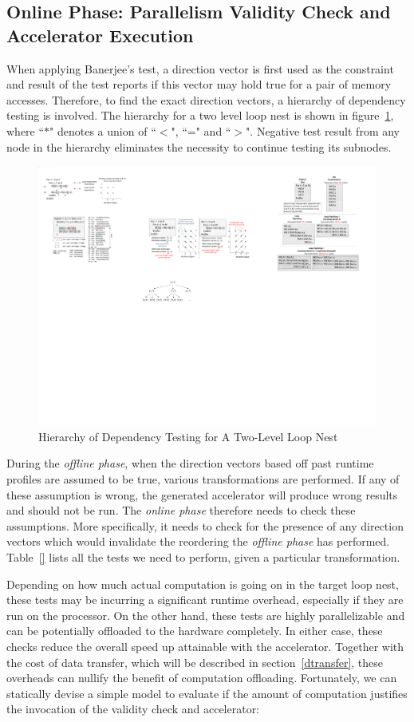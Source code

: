 \subsection{Online Phase: Parallelism Validity Check and Accelerator Execution}
\label{onlinephase}
When applying Banerjee's test, a direction vector is first used as the constraint and result of the test reports if this vector may hold true for a pair of memory accesses. Therefore, to find the exact direction vectors, a hierarchy
of dependency testing is involved. The hierarchy for a two level loop nest is shown in figure~\ref{fig:testingHier}, where ``$\ast$" denotes a union of ``$<$", ``=" and ``$>$". Negative test result from any node in the hierarchy eliminates the necessity to continue testing its subnodes.  


\begin{figure}[htp]
\begin{center}
\includegraphics[width=0.6\linewidth]{chap6fig/testingHier.pdf}
\caption{Hierarchy of Dependency Testing for A Two-Level Loop Nest
\label{fig:testingHier}}
\end{center}
\end{figure}

During the \textit{offline phase}, when the direction vectors based off past runtime profiles are assumed to be true, various transformations are performed. If any of these
assumption is wrong, the generated accelerator will produce wrong results and should
not be run. The \textit{online phase} therefore needs to check these assumptions. More
specifically, it needs to check for the presence of any direction vectors which would
invalidate the reordering the \textit{offline phase} has performed. Table~\ref{} lists
all the tests we need to perform, given a particular transformation.


Depending on how much actual computation is going on in the target loop nest, these tests may be incurring a significant runtime overhead, especially if they are run on the processor. On the other hand, these tests are highly parallelizable and can be potentially
offloaded to the hardware completely. In either case, these checks reduce the overall
speed up attainable with the accelerator. Together with the cost of data transfer, which
will be described in section~\ref{dtransfer}, these overheads can nullify the benefit of computation offloading. Fortunately, we can statically devise a simple model to
evaluate if the amount of computation justifies the invocation of the validity check and
accelerator:

